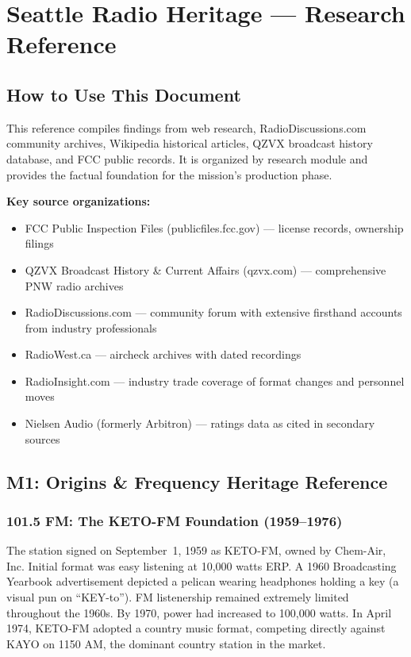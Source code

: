 \documentclass[11pt,letterpaper]{article}
\newcommand{\stageheader}[2]{%
  \noindent\colorbox{#2}{\makebox[\textwidth][l]{%
    \textcolor{white}{\bfseries\sffamily\hspace{6pt}#1\hspace{6pt}}}}%
  \vspace{0.5em}\par%
}
\begin{document}
\newpage

\stageheader{STAGE 2 --- RESEARCH REFERENCE}{secondary}

\section{Seattle Radio Heritage --- Research Reference}

\subsection{How to Use This Document}

This reference compiles findings from web research, RadioDiscussions.com community archives, Wikipedia historical articles, QZVX broadcast history database, and FCC public records. It is organized by research module and provides the factual foundation for the mission's production phase.

\textbf{Key source organizations:}
\begin{itemize}[leftmargin=2em]
\item FCC Public Inspection Files (publicfiles.fcc.gov) --- license records, ownership filings
\item QZVX Broadcast History \& Current Affairs (qzvx.com) --- comprehensive PNW radio archives
\item RadioDiscussions.com --- community forum with extensive firsthand accounts from industry professionals
\item RadioWest.ca --- aircheck archives with dated recordings
\item RadioInsight.com --- industry trade coverage of format changes and personnel moves
\item Nielsen Audio (formerly Arbitron) --- ratings data as cited in secondary sources
\end{itemize}

\subsection{M1: Origins \& Frequency Heritage Reference}

\subsubsection{101.5 FM: The KETO-FM Foundation (1959--1976)}

The station signed on September~1, 1959 as KETO-FM, owned by Chem-Air, Inc. Initial format was easy listening at 10,000 watts ERP. A 1960 Broadcasting Yearbook advertisement depicted a pelican wearing headphones holding a key (a visual pun on ``KEY-to''). FM listenership remained extremely limited throughout the 1960s. By 1970, power had increased to 100,000 watts. In April 1974, KETO-FM adopted a country music format, competing directly against KAYO on 1150 AM, the dominant country station in the market.
\end{document}
